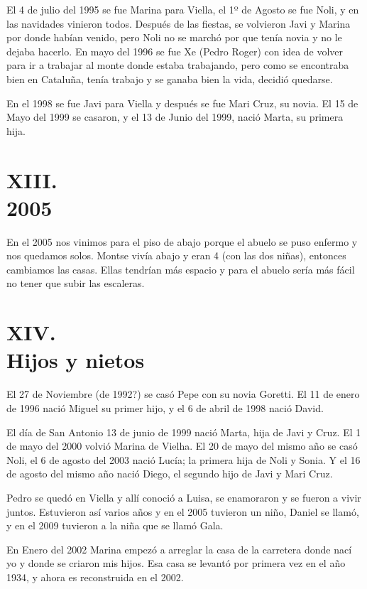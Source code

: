 \documentclass[12pt,a5paper]{book}
\begin{document}
El 4 de julio del 1995 se fue Marina para Viella, el 1º de Agosto se fue Noli, y en las navidades vinieron todos. Después de las fiestas, se volvieron Javi y Marina por donde habían venido, pero Noli no se marchó por que tenía novia y no le dejaba hacerlo. En mayo del 1996 se fue Xe (Pedro Roger) con idea de volver para ir a trabajar al monte donde estaba trabajando, pero como se encontraba bien en Cataluña, tenía trabajo y se ganaba bien la vida, decidió quedarse.

En el 1998 se fue Javi para Viella y después se fue Mari Cruz, su novia. El 15 de Mayo del 1999 se casaron, y el 13 de Junio del 1999, nació Marta, su primera hija.


\section*{XIII.\\2005}

En el 2005 nos vinimos para el piso de abajo porque el abuelo se puso enfermo y nos quedamos solos. Montse vivía abajo y eran 4 (con las dos niñas), entonces cambiamos las casas. Ellas tendrían más espacio y para el abuelo sería más fácil no tener que subir las escaleras.


\section*{XIV.\\Hijos y nietos}

El 27 de Noviembre (de 1992?) se casó Pepe con su novia Goretti. El 11 de enero de 1996 nació Miguel su primer hijo, y el 6 de abril de 1998 nació David.

El día de San Antonio 13 de junio de 1999 nació Marta, hija de Javi y Cruz. El 1 de mayo del 2000 volvió Marina de Vielha. El 20 de mayo del mismo año se casó Noli, el 6 de agosto del 2003 nació Lucía; la primera hija de Noli y Sonia. Y el 16 de agosto del mismo año nació Diego, el segundo hijo de Javi y Mari Cruz.

Pedro se quedó en Viella y allí conoció a Luisa, se enamoraron y se fueron a vivir juntos. Estuvieron así varios años y en el 2005 tuvieron un niño, Daniel se llamó, y en el 2009 tuvieron a la niña que se llamó Gala.

En Enero del 2002 Marina empezó a arreglar la casa de la carretera donde nací yo y donde se criaron mis hijos. Esa casa se levantó por primera vez en el año 1934, y ahora es reconstruida en el 2002.
\end{document}
